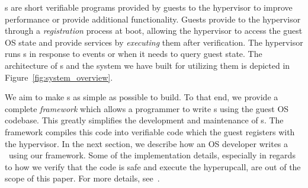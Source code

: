 \documentclass[11pt]{article}
\begin{document}
\Hypercallback{}s are short verifiable programs provided by
guests to the hypervisor to improve performance 
or provide additional functionality. Guests provide 
to the hypervisor through a \emph{registration} process at boot, allowing
the hypervisor to access the guest OS state and provide services by \emph{executing} them
after verification. The hypervisor runs \hypercallback{}s 
in response to events or when it needs to
query guest state. The architecture
of \hypercallback{}s and the system we have built for utilizing them is depicted in Figure~\ref{fig:system_overview}.

We aim to make \hypercallback{}s as simple as possible to build. To that end, 
we provide a complete \emph{framework} which allows a programmer to write
\hypercallback{}s using the guest OS codebase. This greatly simplifies the development and maintenance of 
\hypercallback{}s. The framework compiles this code into verifiable code which the
guest registers with the hypervisor. In the next section, we describe how an OS
developer writes a \hypercallback~using our framework. Some of the implementation details, especially in regards
to how we verify that the code is safe and execute the hyperupcall, are out of the scope of this paper. For more details, see~\cite{amit2018design}.




\end{document}
